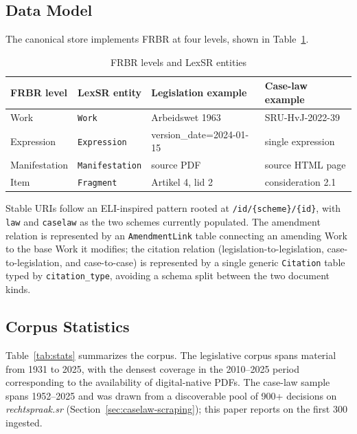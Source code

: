 \documentclass{IOS-Book-Article}
\begin{document}
\subsection{Data Model}

The canonical store implements FRBR at four levels, shown in Table~\ref{tab:frbr}.

\begin{table}[h]
\caption{FRBR levels and LexSR entities}
\label{tab:frbr}
\begin{tabular}{|l|l|l|l|}
\hline
\textbf{FRBR level} & \textbf{LexSR entity} & \textbf{Legislation example} & \textbf{Case-law example} \\
\hline
Work & \texttt{Work} & Arbeidswet 1963 & SRU-HvJ-2022-39 \\
Expression & \texttt{Expression} & version\_date=2024-01-15 & single expression \\
Manifestation & \texttt{Manifestation} & source PDF & source HTML page \\
Item & \texttt{Fragment} & Artikel 4, lid 2 & consideration 2.1 \\
\hline
\end{tabular}
\end{table}

Stable URIs follow an ELI-inspired pattern rooted at \texttt{/id/\{scheme\}/\{id\}}, with
\texttt{law} and \texttt{caselaw} as the two schemes currently populated. The amendment relation is
represented by an \texttt{AmendmentLink} table connecting an amending Work to the base Work it
modifies; the citation relation (legislation-to-legislation, case-to-legislation, and
case-to-case) is represented by a single generic \texttt{Citation} table typed by
\texttt{citation\_type}, avoiding a schema split between the two document kinds.

\subsection{Corpus Statistics}

Table~\ref{tab:stats} summarizes the corpus. The legislative corpus spans material from 1931 to 2025, with the densest coverage in the
2010--2025 period corresponding to the availability of digital-native PDFs. The case-law
sample spans 1952--2025 and was drawn from a discoverable pool of 900+ decisions on
\emph{rechtspraak.sr} (Section~\ref{sec:caselaw-scraping}); this paper reports on the first 300 ingested.
\end{document}
